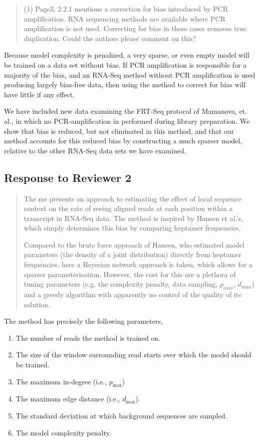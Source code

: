 \documentclass{article}
\begin{document}
\begin{quote}
(1) Page3, 2.2.1 mentions a correction for bias introduced by PCR amplification.
RNA sequencing methods are available where PCR amplification is not used.
Correcting for bias in these cases removes true duplication.  Could the authors
please comment on this?
\end{quote}

Because model complexity is penalized, a very sparse, or even empty model will
be trained on a data set without bias.  If PCR amplification is responsible for
a majority of the bias, and an RNA-Seq method without PCR amplification is used
producing largely bias-free data, then using the method to correct for bias
will have little if any effect.

We have included new data examining the FRT-Seq protocol of Mamanova, et. al.,
in which no PCR-amplification in performed during library preparation. We show
that bias is reduced, but not eliminated in this method, and that our method
accounts for this reduced bias by constructing a much sparser model, relative to
the other RNA-Seq data sets we have examined.


\subsection*{Response to Reviewer 2}

\begin{quote}
The ms presents an approach to estimating the effect of local sequence
context on the rate of seeing aligned reads at each position within a
transcript in RNA-Seq data. The method is inspired by Hansen et al.'s,
which simply determines this bias by comparing heptamer frequencies.

Compared to the brute force approach of Hansen, who estimated model
parameters (the density of a joint distribution) directly from
heptamer frequencies, here a Bayesian network approach is taken, which
allows for a sparser parameterisation. However, the cost for this are
a plethora of tuning parameters (e.g. the complexity penalty, data
sampling, $p_{max}$, $d_{max}$) and a greedy algorithm with apparently no
control of the quality of its solution.
\end{quote}

The method has precisely the following parameters,
\begin{enumerate}
\item The number of reads the method is trained on.
\item The size of the window surrounding read starts over which the model should
be trained.
\item The maximum in-degree (i.e., $p_{\text{max}}$)
\item The maximum edge distance (i.e., $d_{\text{max}}$).
\item The standard deviation at which background sequences are sampled.
\item The model complexity penalty.
\end{enumerate}
\end{document}
